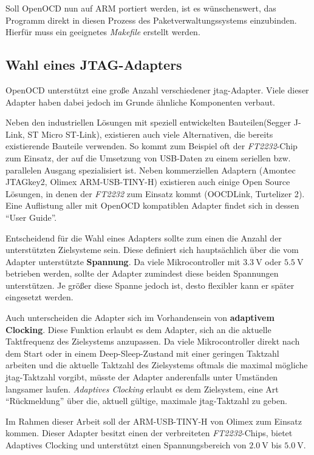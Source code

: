 Soll OpenOCD nun auf ARM portiert werden, ist es wünschenswert, das Programm
direkt in diesen Prozess des Paketverwaltungssystems einzubinden. Hierfür muss
ein geeignetes \emph{Makefile} erstellt werden.

\subsection{Wahl eines JTAG-Adapters}
OpenOCD unterstützt eine große Anzahl verschiedener \gls{jtag}-Adapter.
Viele dieser Adapter haben dabei jedoch im Grunde ähnliche Komponenten verbaut.

Neben den industriellen Lösungen mit speziell entwickelten Bauteilen(Segger
J-Link\cite{SEG}, ST Micro ST-Link\cite{STM01}), existieren auch viele
Alternativen, die bereits existierende Bauteile verwenden. So kommt zum Beispiel oft der
\emph{FT2232}-Chip zum Einsatz, der auf die Umsetzung von USB-Daten zu einem
seriellen bzw. parallelen Ausgang spezialisiert ist. Neben kommerziellen
Adaptern (Amontec JTAGkey2\cite{AMO}, Olimex ARM-USB-TINY-H\cite{OLI})
existieren auch einige Open Source Lösungen, in denen der \emph{FT2232} zum
Einsatz kommt (OOCDLink\cite{OCDL}, Turtelizer 2\cite{TURT}). Eine Auflistung
aller mit OpenOCD kompatiblen Adapter findet sich in dessen "`User Guide"'\cite{OOCD}.

Entscheidend für die Wahl eines Adapters sollte zum einen die Anzahl der
unterstützten Zielsysteme sein. Diese definiert sich hauptsächlich über die
vom Adapter unterstützte \textbf{Spannung}. Da viele Mikrocontroller mit
$\SI{3.3}{\volt}$ oder $\SI{5.5}{\volt}$ betrieben werden, sollte der Adapter
zumindest diese beiden Spannungen unterstützen. Je größer diese Spanne jedoch ist, desto flexibler kann
er später eingesetzt werden.

Auch unterscheiden die Adapter sich im Vorhandensein von \textbf{adaptivem
Clocking}. Diese Funktion erlaubt es dem Adapter, sich an die aktuelle
Taktfrequenz des Zielsystems anzupassen. Da viele Mikrocontroller direkt nach
dem Start oder in einem Deep-Sleep-Zustand mit einer geringen Taktzahl arbeiten
und die aktuelle Taktzahl des Zielsystems oftmals die maximal mögliche
\gls{jtag}-Taktzahl vorgibt, müsste der Adapter anderenfalls unter Umständen langsamer
laufen. \emph{Adaptives Clocking} erlaubt es dem Zielsystem, eine Art
"`Rückmeldung"' über die, aktuell gültige, maximale \gls{jtag}-Taktzahl zu geben.

Im Rahmen dieser Arbeit soll der ARM-USB-TINY-H von Olimex zum Einsatz kommen.
Dieser Adapter besitzt einen der verbreiteten \emph{FT2232}-Chips, bietet
Adaptives Clocking und unterstützt einen Spannungsbereich von $\SI{2.0}{\volt}$
bis $\SI{5.0}{\volt}$.

